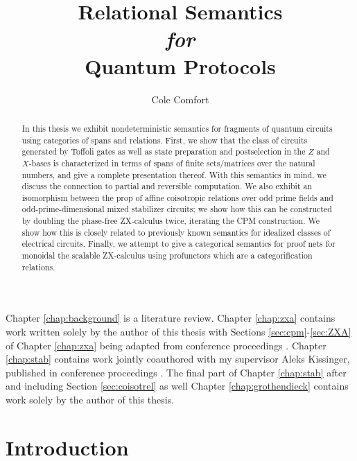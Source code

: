 \documentclass[12pt]{ociamthesis}  %
\title{Relational Semantics \\{ \it \Large for}\\ Quantum Protocols}
\author{Cole Comfort}
\begin{document}
\maketitle


\begin{abstract}
In this thesis we exhibit nondeterministic semantics for fragments of quantum circuits using  categories of spans and relations.  First, we show that the class of circuits generated by Toffoli gates as well as state preparation and postselection in the $Z$ and $X$-bases is characterized in terms of spans of finite sets/matrices over the natural numbers, and give a complete presentation thereof. With this semantics in mind, we discuss the connection to partial and reversible computation. We also exhibit an isomorphism between the prop of affine coisotropic relations over odd prime fields and odd-prime-dimensional mixed stabilizer circuits; we show how this can be constructed by doubling the phase-free ZX-calculus twice, iterating the CPM construction.   We show how this is closely related to previously known semantics for idealized classes of electrical circuits.     Finally, we attempt to give a categorical semantics for proof nets for monoidal the scalable ZX-calculus using profunctors which are a categorification relations.
\end{abstract}


\begin{originality}

Chapter \ref{chap:background} is a literature review.  Chapter \ref{chap:zxa} contains work written solely by the author of this thesis with Sections \ref{sec:cpm}-\ref{sec:ZXA} of Chapter \ref{chap:zxa} being adapted from conference proceedings \cite{zxa}.  Chapter \ref{chap:stab} contains work jointly coauthored with my supervisor Aleks Kissinger, published in conference proceedings \cite{lagrel}.  The final part of Chapter  \ref{chap:stab} after and including Section \ref{sec:coisotrel} as well Chapter \ref{chap:grothendieck} contains work solely by the author of this thesis.


\end{originality}
\tableofcontents


\chapter{Introduction}
\label{chap:intro}
\end{document}
